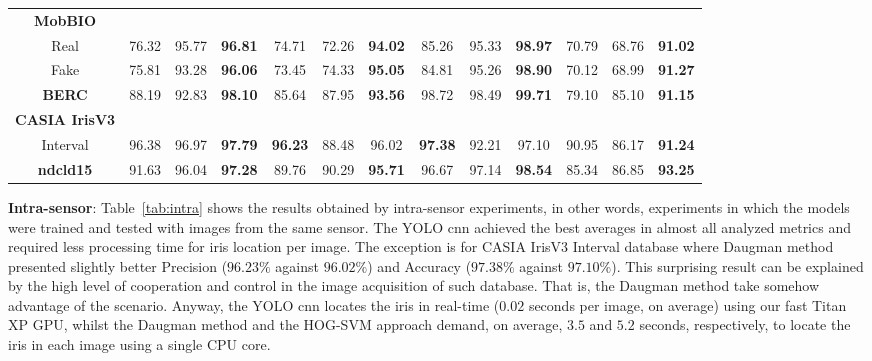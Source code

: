 \documentclass[conference]{IEEEtran}
\begin{document}
\begin{table*}[!ht]
\begin{tabular}{c c c c c c c c c c c c c}
		\textbf{MobBIO} \\ Real    &  76.32  & 95.77   & \textbf{96.81} & 74.71   & 72.26    & \textbf{94.02} & 85.26   & 95.33   & \textbf{98.97}  & 70.79   & 68.76      & \textbf{91.02}   \\ 
		                   Fake    &  75.81  & 93.28   & \textbf{96.06} & 73.45   & 74.33    & \textbf{95.05} & 84.81   & 95.26   & \textbf{98.90}  & 70.12   & 68.99      & \textbf{91.27}   \\ \midrule
		                   \textbf{BERC}              &  88.19  & 92.83   & \textbf{98.10} & 85.64   & 87.95    & \textbf{93.56} & 98.72   & 98.49   & \textbf{99.71}  & 79.10   & 85.10      & \textbf{91.15}   \\ \midrule
		\textbf{CASIA IrisV3} \\
		     Interval              &  96.38  & 96.97   & \textbf{97.79} & \textbf{96.23}   & 88.48    & 96.02 & \textbf{97.38}   & 92.21   & 97.10  & 90.95   & 86.17      & \textbf{91.24}   \\ \midrule
		\textbf{\gls*{ndcld15}}           &   91.63 & 96.04   & \textbf{97.28} & 89.76   & 90.29    & \textbf{95.71} & 96.67   & 97.14   & \textbf{98.54}  & 85.34   & 86.85      & \textbf{93.25}   \\ \bottomrule
		
	\end{tabular}
\end{table*}


\textbf{Intra-sensor}: 
Table~\ref{tab:intra} shows the results obtained by intra-sensor experiments, in other words, experiments in which the models were trained and tested with images from the same sensor.
The YOLO \gls*{cnn} achieved the best averages in almost all analyzed metrics and required less processing time for iris location per image. 
The exception is for CASIA IrisV3 Interval database where Daugman method presented slightly better Precision ($96.23\%$ against $96.02\%$) and Accuracy ($97.38\%$ against $97.10\%$).
This surprising result can be explained by the high level of cooperation and control in the image acquisition of such database. 
That is, the Daugman method take somehow advantage of the scenario.
Anyway, the YOLO \gls*{cnn} locates the iris in real-time ($0.02$ seconds per image, on average) using our fast Titan XP GPU, whilst the Daugman method and the HOG-SVM approach demand, on average, $3.5$ and $5.2$ seconds, respectively, to locate the iris in each image using a single CPU core.
\end{document}
